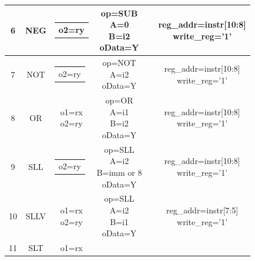 \documentclass[10pt]{article}
\makeatletter
\newcommand{\zcell}[2]{\begin{tabular}{@{}#1@{}}#2\end{tabular}}
\makeatother
\begin{document}
\begin{CJK}{UTF8}{gbsn}
\begin{center}
\begin{longtable}{|c|c|c|c|c|c|}
6  & NEG       &\zcell{c}{o2=ry}  &\zcell{c}{op=SUB\\ 
								   A=0\\
								   B=i2\\
								   oData=Y}           &                         &\zcell{c}{
																				 reg\_addr=instr[10:8]\\
														                         write\_reg='1'}\\\hline
7  & NOT       &\zcell{c}{o2=ry}  &\zcell{c}{op=NOT\\ 
								   A=i2\\
								   oData=Y}           &                         &\zcell{c}{
																				 reg\_addr=instr[10:8]\\
														                         write\_reg='1'}\\\hline
8  & OR        &\zcell{c}{o1=rx\\                                                            
				o2=ry}            &\zcell{c}{op=OR\\
								   A=i1\\B=i2\\
								   oData=Y}           &                         &\zcell{c}{
																				 reg\_addr=instr[10:8]\\
														                         write\_reg='1'}\\\hline
9  & SLL       &\zcell{c}{o2=ry}  &\zcell{c}{op=SLL\\ 
								   A=i2\\B=imm or 8\\ 
								   oData=Y}           &                         &\zcell{c}{
																				 reg\_addr=instr[10:8]\\
														                         write\_reg='1'}\\\hline
10 & SLLV      &\zcell{c}{o1=rx\\                                                            
				o2=ry}            &\zcell{c}{op=SLL\\ 
								   A=i2\\B=i1\\
								   oData=Y}           &                         &\zcell{c}{
																				 reg\_addr=instr[7:5]\\
														                         write\_reg='1'}\\\hline
11 & SLT       &\zcell{c}{o1=rx\\                                                            
}
\end{longtable}
\end{center}
\end{CJK}
\end{document}
